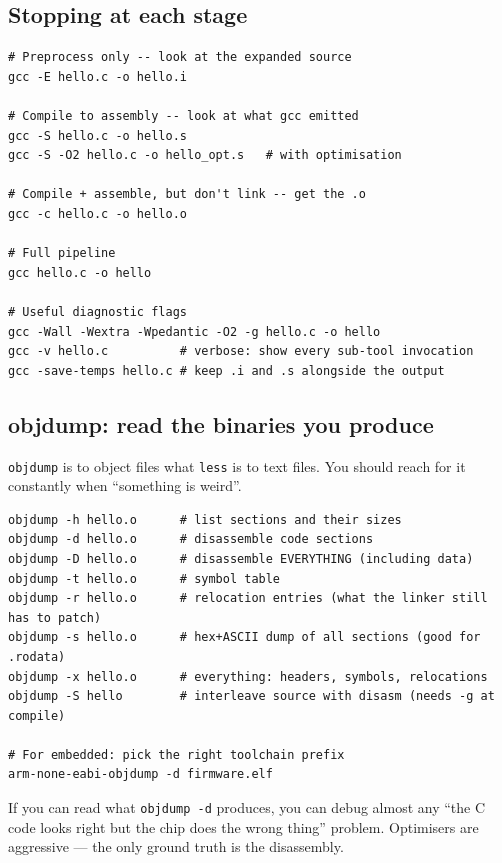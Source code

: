 \documentclass[11pt,a4paper]{article}
\begin{document}
\subsection{Stopping at each stage}

\begin{lstlisting}[style=shell, caption={Useful gcc invocations}]
# Preprocess only -- look at the expanded source
gcc -E hello.c -o hello.i

# Compile to assembly -- look at what gcc emitted
gcc -S hello.c -o hello.s
gcc -S -O2 hello.c -o hello_opt.s   # with optimisation

# Compile + assemble, but don't link -- get the .o
gcc -c hello.c -o hello.o

# Full pipeline
gcc hello.c -o hello

# Useful diagnostic flags
gcc -Wall -Wextra -Wpedantic -O2 -g hello.c -o hello
gcc -v hello.c          # verbose: show every sub-tool invocation
gcc -save-temps hello.c # keep .i and .s alongside the output
\end{lstlisting}

\subsection{objdump: read the binaries you produce}

\texttt{objdump} is to object files what \texttt{less} is to text files.
You should reach for it constantly when ``something is weird''.

\begin{lstlisting}[style=shell, caption={objdump cheat sheet}]
objdump -h hello.o      # list sections and their sizes
objdump -d hello.o      # disassemble code sections
objdump -D hello.o      # disassemble EVERYTHING (including data)
objdump -t hello.o      # symbol table
objdump -r hello.o      # relocation entries (what the linker still has to patch)
objdump -s hello.o      # hex+ASCII dump of all sections (good for .rodata)
objdump -x hello.o      # everything: headers, symbols, relocations
objdump -S hello        # interleave source with disasm (needs -g at compile)

# For embedded: pick the right toolchain prefix
arm-none-eabi-objdump -d firmware.elf
\end{lstlisting}

\begin{keyidea}
If you can read what \texttt{objdump -d} produces, you can debug almost any
``the C code looks right but the chip does the wrong thing'' problem.
Optimisers are aggressive --- the only ground truth is the disassembly.
\end{keyidea}
\end{document}
